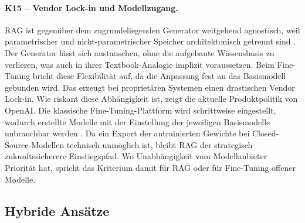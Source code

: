 \paragraph{K15 -- Vendor Lock-in und Modellzugang.}\label{krit:k15}
RAG ist gegenüber dem zugrundeliegenden Generator weitgehend agnostisch, weil parametrischer und nicht-parametrischer Speicher architektonisch getrennt sind \autocite[2]{Lewis.2020}. Der Generator lässt sich austauschen, ohne die aufgebaute Wissensbasis zu verlieren, was auch \textcite[4f.]{Gao.2024} in ihrer Textbook-Analogie implizit voraussetzen.
Beim Fine-Tuning bricht diese Flexibilität auf, da die Anpassung fest an das Basismodell gebunden wird. Das erzeugt bei proprietären Systemen einen drastischen Vendor Lock-in. Wie riskant diese Abhängigkeit ist, zeigt die aktuelle Produktpolitik von OpenAI. Die klassische Fine-Tuning-Plattform wird schrittweise eingestellt, wodurch erstellte Modelle mit der Einstellung der jeweiligen Basismodelle unbrauchbar werden \autocite{OpenAI.2026}. Da ein Export der antrainierten Gewichte bei Closed-Source-Modellen technisch unmöglich ist, bleibt RAG der strategisch zukunftssicherere Einstiegspfad.
Wo Unabhängigkeit vom Modellanbieter Priorität hat, spricht das Kriterium damit für RAG oder für Fine-Tuning offener Modelle.

\subsection{Hybride Ansätze}
\label{sec:krit-hybrid}

